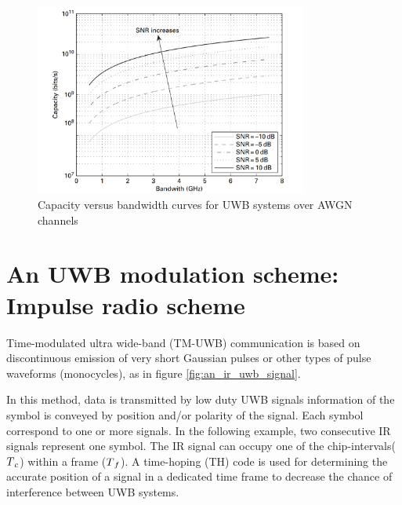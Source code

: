 \documentclass[\main/main.tex]{subfiles}
\begin{document}
\begin{figure}[H]
    \centering
    \includegraphics[width=0.8\textwidth]{capacity_versus_bandwidth_curves_for_uwb_systems_over_awgn_channels}
    \caption{Capacity versus bandwidth curves for UWB systems over AWGN channels}
    \label{fig:capacity_versus_bandwidth_curves_for_uwb_systems_over_awgn_channels}
\end{figure}

\section{An UWB modulation scheme: Impulse radio scheme}

Time-modulated ultra wide-band (TM-UWB) communication is based on discontinuous emission of very short Gaussian pulses or other types of pulse waveforms (monocycles), as in figure \ref{fig:an_ir_uwb_signal}. 

In this method, data is transmitted by low duty UWB signals information of the symbol is conveyed by position and/or polarity of the signal. Each symbol correspond to one or more signals. In the following example, two consecutive IR signals represent one symbol. The IR signal can occupy one of the chip-intervals($T\textsubscript{$c$}$) within a frame ($T\textsubscript{$f$}$). A time-hoping (TH) code is used for determining the accurate position of a signal in a dedicated time frame to decrease the chance of interference between UWB systems. 

\end{document}
